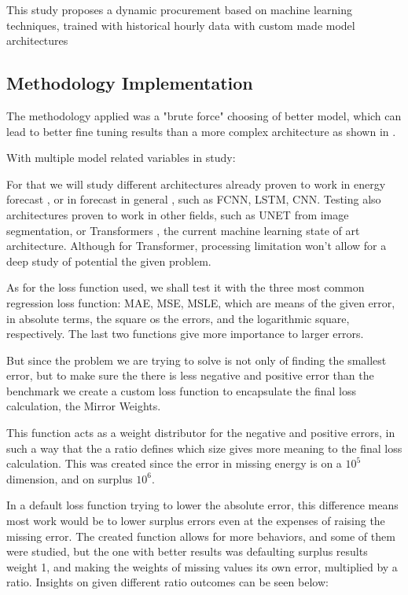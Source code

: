 

This study proposes a dynamic procurement based on machine learning techniques, trained with historical hourly data with custom made model architectures

\subsection{Methodology Implementation}

The methodology applied was a "brute force" choosing of better model, which can lead to better fine tuning results than a more complex architecture as shown in \cite{Liu2022}.\par
With multiple model related variables in study:\par



For that we will study different architectures already proven to work in energy forecast \cite{Costa2022}, or in forecast in general \cite{Hewamalage2021}, such as \gls{FCNN}, \gls{LSTM}, \gls{CNN}. Testing also architectures proven to work in other fields, such as UNET \cite{Shelhamer2014} from image segmentation, or Transformers \cite{Vaswani2017}, the current machine learning state of art architecture. Although for Transformer, processing limitation won't allow for a deep study of potential the given problem.\par
As for the loss function used, we shall test it with the three most common regression loss function: \gls{MAE}, \gls{MSE}, \gls{MSLE}, which are means of the given error, in absolute terms, the square os the errors, and the logarithmic square, respectively. The last two functions give more importance to larger errors.\par
But since the problem we are trying to solve is not only of finding the smallest error, but to make sure the there is less negative and positive error than the benchmark we create a custom loss function to encapsulate the final loss calculation, the Mirror Weights. %

This function acts as a weight distributor for the negative and positive errors, in such a way that the a ratio defines which size gives more meaning to the final loss calculation. This was created since the error in missing energy is on a $10^{5}$ dimension, and on surplus $10^{6}$.\par
In a default loss function trying to lower the absolute error, this difference means most work would be to lower surplus errors even at the expenses of raising the missing error. The created function allows for more behaviors, and some of them were studied, but the one with better results was defaulting surplus results weight 1, and making the weights of missing values its own error, multiplied by a ratio. Insights on given different ratio outcomes can be seen below:\par


